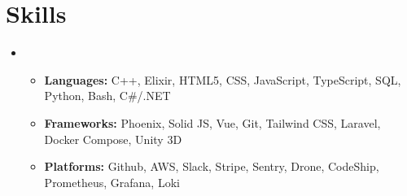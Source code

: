 \documentclass[11pt]{extarticle}
\newcommand{\sectiontitle}[1]{
	\section*{\sectiontext #1}
	\vspace{-2pt}
}
\begin{document}
\sectiontitle{Skills}
\begin{itemize}[leftmargin=1em]
	\item[]
	\begin{itemize}
		\item \textbf{Languages:} C++, Elixir, HTML5, CSS, JavaScript, TypeScript,
		SQL, Python, Bash, C\#/.NET
		\item \textbf{Frameworks:} Phoenix, Solid JS, Vue, Git, Tailwind CSS,
		Laravel, Docker Compose, Unity 3D
		\item \textbf{Platforms:} Github, AWS, Slack, Stripe, Sentry, Drone,
		CodeShip, Prometheus, Grafana, Loki
	\end{itemize}
\end{itemize}
\vspace{-20pt}
\end{document}
